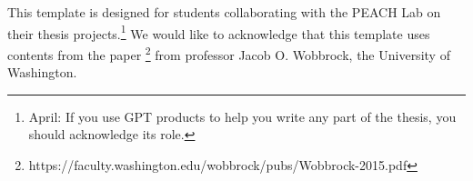 This template is designed for students collaborating with the \ac{PEACH} Lab on their thesis projects.\footnote{April: If you use GPT products to help you write any part of the thesis, you should acknowledge its role.}
We would like to acknowledge that this template uses contents from the paper \footnote{https://faculty.washington.edu/wobbrock/pubs/Wobbrock-2015.pdf} from professor Jacob O. Wobbrock, the University of Washington.
